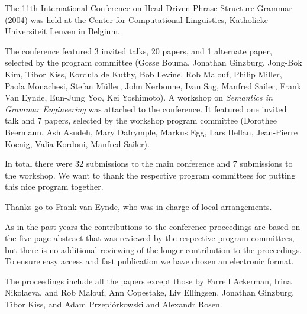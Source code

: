 The 11th International Conference on Head-Driven Phrase Structure Grammar (2004) was held at
the Center for Computational Linguistics, Katholieke Universiteit Leuven in Belgium.

The conference featured 3 invited talks, 20 papers, and 1 alternate paper,
selected by the program committee (Gosse Bouma, Jonathan Ginzburg, Jong-Bok Kim, Tibor Kiss, Kordula de Kuthy, Bob Levine, Rob Malouf, Philip Miller, Paola Monachesi, Stefan Müller, John Nerbonne, Ivan Sag, Manfred Sailer, Frank Van Eynde, Eun-Jung Yoo, Kei Yoshimoto). 
A workshop on \emph{Semantics in Grammar Engineering} was attached to the conference. It featured one invited talk
and 7 papers, selected by the workshop program committee (Dorothee Beermann, Ash Asudeh, Mary Dalrymple, Markus Egg, Lars Hellan, Jean-Pierre Koenig, Valia Kordoni, Manfred Sailer).

In total there were 32 submissions to the main conference and 7 submissions to the
workshop. 
We want to thank the respective program committees for putting this nice program together.

Thanks go to Frank van Eynde, who was in charge of local arrangements.

As in the past years the contributions to the conference proceedings are based on the five page abstract
that was reviewed by the respective program committees, but there is no additional reviewing of the
longer contribution to the proceedings.
To ensure easy access and fast publication we have chosen an electronic format.

The proceedings include all the papers except those by Farrell Ackerman, Irina Nikolaeva, and Rob Malouf, Ann Copestake, 
Liv Ellingsen, Jonathan Ginzburg, Tibor Kiss, and Adam Przepiórkowski and Alexandr Rosen.
